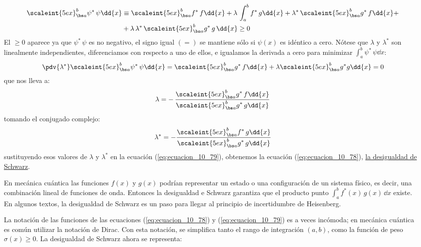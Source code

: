 \begin{align}
\begin{aligned}
\scaleint{5ex}_{\bs a}^{b} \psi^{*} \, \psi \dd{x} &\equiv \scaleint{5ex}_{\bs a}^{b} f^{*} \, f \dd{x} + \lambda \, \int_{a}^{b} f^{*} \, g \dd{x} + \lambda^{*} \, \scaleint{5ex}_{\bs a}^{b} g^{*} \, f \dd{x} + \\
&+ \lambda \, \lambda^{*} \, \scaleint{5ex}_{\bs a}^{b} g^{*} \, g \, \dd{x}  \geq 0
\end{aligned}
\label{eq:ecuacion_10_79}
\end{align}
El $\geq 0$ aparece ya que $\psi^{*} \, \psi$ es no negativo, el signo igual $(=)$ se mantiene sólo si $\psi (x)$ es idéntico a cero. Nótese que $\lambda$ y $\lambda^{*}$ son linealmente independientes, diferenciamos con respecto a uno de ellos, e igualamos la derivada a cero para minimizar $\displaystyle \int_{a}^{b} \psi^{*} \, \psi \dd{x}$:
\begin{align*}
\pdv{\lambda^{*}} \scaleint{5ex}_{\bs a}^{b} \psi^{*} \, \psi \dd{x} = \scaleint{5ex}_{\bs a}^{b} g^{*} \, f \dd{x}  + \lambda \scaleint{5ex}_{\bs a}^{b} g^{*} g \dd{x} = 0
\end{align*}
que nos lleva a:
\begin{align}
\lambda = - \, \dfrac{\displaystyle \scaleint{5ex}_{\bs a}^{b} g^{*} \, f \dd{x}}{\displaystyle \scaleint{5ex}_{\bs a}^{b} g^{*} \, g \dd{x}}
\label{eq:ecuacion_10_80a}
\end{align}
tomando el conjugado complejo: 
\begin{align}
\lambda^{*} = - \dfrac{\displaystyle \scaleint{5ex}_{\bs a}^{b} f^{*} \, g \dd{x}}{\displaystyle \scaleint{5ex}_{\bs a}^{b} g^{*} \, g \dd{x}}
\label{eq:ecuacion_80b}
\end{align}
sustituyendo esos valores de $\lambda$ y $\lambda^{*}$ en la ecuación (\ref{eq:ecuacion_10_79}), obtenemos la ecuación (\ref{eq:ecuacion_10_78}), \underline{la desigualdad de Schwarz}.
\par
En mecánica cuántica las funciones $f (x)$ y $g (x)$ podrían representar un estado o una configuración de un sistema físico, es decir, una combinación lineal de funciones de onda. Entonces la desigualdad e Schwarz garantiza que el producto punto $\displaystyle \int_{a}^{b} f^{*} (x) \, g(x) \, \dd{x}$ existe. En algunos textos, la desigualdad de Schwarz es un paso para llegar al principio de incertidumbre de Heisenberg.
\par
La notación de las funciones de las ecuaciones (\ref{eq:ecuacion_10_78}) y (\ref{eq:ecuacion_10_79}) es a veces incómoda; en mecánica cuántica es común utilizar la notación de Dirac. Con esta notación, se simplifica tanto el rango de integración $(a, b)$, como la función de peso $\sigma (x) \geq 0$. La desigualdad de Schwarz ahora se representa:
